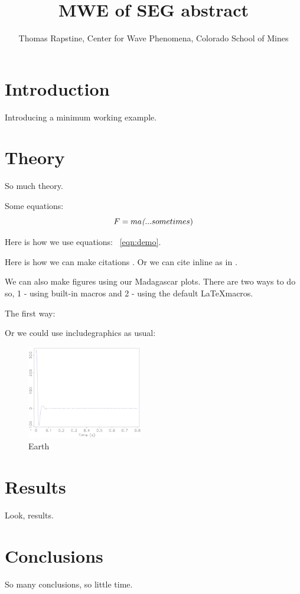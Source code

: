 
\title{MWE of SEG abstract}
\author{Thomas Rapstine, Center for Wave Phenomena, Colorado School of Mines}

\maketitle

\section{Introduction}
Introducing a minimum working example.

\section{Theory}
So much theory.

Some equations:
\begin{equation} \label{eqn:demo}
 F=ma \textit( ... sometimes)
\end{equation}

Here is how we use equations: ~\ref{eqn:demo}.  

Here is how we can make citations \cite[]{godwin_blended_2010,krebs_fast_2009,duquet_3d_1999}. Or we can cite inline as in \cite{godwin_blended_2010}.

We can also make figures using our Madagascar plots.  There are two ways to do so, 1 - using built-in macros and 2 - using the default \LaTeX macros.

The first way:


Or we could use includegraphics as usual:

\begin{figure}
    \includegraphics[width=0.45\textwidth]{data/Fig/noise} 
    \caption{Earth}
\label{Fig:core}
\end{figure}

\section{Results}
Look, results.

\section{Conclusions}
So many conclusions, so little time.



